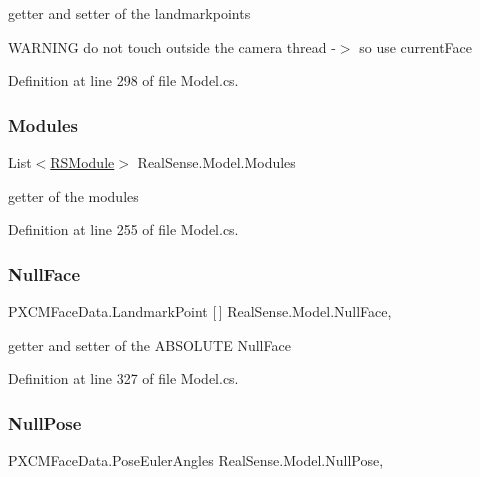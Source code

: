 getter and setter of the landmarkpoints

W\+A\+R\+N\+I\+NG do not touch outside the camera thread -\/$>$ so use current\+Face 

Definition at line 298 of file Model.\+cs.

\mbox{\label{class_real_sense_1_1_model_a9664e53331481e9cc45ad6d3540c218c}} 
\subsubsection{\texorpdfstring{Modules}{Modules}}
{\footnotesize\ttfamily List$<$\hyperlink{class_real_sense_1_1_r_s_module}{R\+S\+Module}$>$ Real\+Sense.\+Model.\+Modules\hspace{0.3cm}{\ttfamily [get]}}

getter of the modules 

Definition at line 255 of file Model.\+cs.

\mbox{\label{class_real_sense_1_1_model_af626df64a18cb2fcf4cbc06ffbadfa17}} 
\subsubsection{\texorpdfstring{Null\+Face}{NullFace}}
{\footnotesize\ttfamily P\+X\+C\+M\+Face\+Data.\+Landmark\+Point \mbox{[}$\,$\mbox{]} Real\+Sense.\+Model.\+Null\+Face\hspace{0.3cm}{\ttfamily [get]}, {\ttfamily [set]}}

getter and setter of the A\+B\+S\+O\+L\+U\+TE Null\+Face 

Definition at line 327 of file Model.\+cs.

\mbox{\label{class_real_sense_1_1_model_af6cb31aea9e1e0fd3ef87c9380e92193}} 
\subsubsection{\texorpdfstring{Null\+Pose}{NullPose}}
{\footnotesize\ttfamily P\+X\+C\+M\+Face\+Data.\+Pose\+Euler\+Angles Real\+Sense.\+Model.\+Null\+Pose\hspace{0.3cm}{\ttfamily [get]}, {\ttfamily [set]}}

